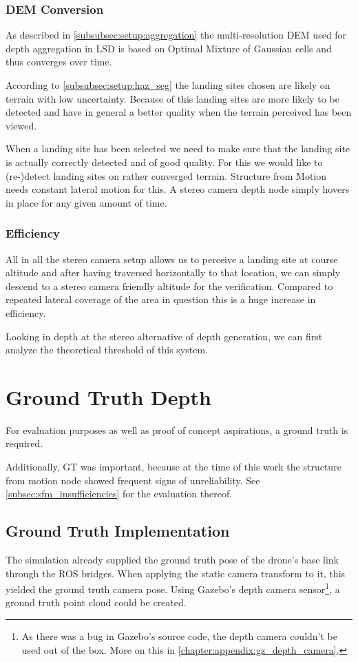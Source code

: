 \subsubsection{DEM Conversion}

As described in \cref{subsubsec:setup:aggregation} the multi-resolution DEM used for depth aggregation in LSD is based on Optimal Mixture of Gaussian cells and thus converges over time. 

According to \cref{subsubsec:setup:haz_seg} the landing sites chosen are likely on terrain with low uncertainty. Because of this landing sites are more likely to be detected and have in general a better quality when the terrain perceived has been viewed.

When a landing site has been selected we need to make sure that the landing site is actually correctly detected and of good quality. For this we would like to (re-)detect landing sites on rather converged terrain. Structure from Motion needs constant lateral motion for this. A stereo camera depth node simply hovers in place for any given amount of time.

\subsubsection{Efficiency}

All in all the stereo camera setup allows us to perceive a landing site at course altitude and after having traversed horizontally to that location, we can simply descend to a stereo camera friendly altitude for the verification. Compared to repeated lateral coverage of the area in question this is a huge increase in efficiency.

Looking in depth at the stereo alternative of depth generation, we can first analyze the theoretical threshold of this system.

\section{Ground Truth Depth}

For evaluation purposes as well as proof of concept aspirations, a ground truth is required. 

Additionally, GT was important, because at the time of this work the structure from motion node showed frequent signs of unreliability. See \cref{subsec:sfm_insufficiencies} for the evaluation thereof.

\subsection{Ground Truth Implementation}
The simulation already supplied the ground truth pose of the drone's base link through the ROS bridges. When applying the static camera transform to it, this yielded the ground truth camera pose. Using Gazebo's depth camera sensor\footnote[1]{As there was a bug in Gazebo's source code, the depth camera couldn't be used out of the box. More on this in \cref{chapter:appendix:gz_depth_camera}.}, a ground truth point cloud could be created.

